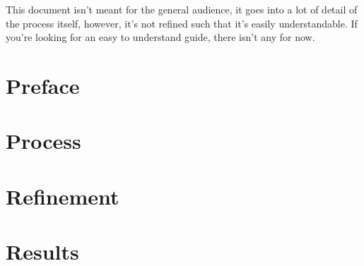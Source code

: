 \documentclass{article}
\begin{document}
	This document isn't meant for the general audience, it goes into a lot of detail of the process itself, however, it's not refined such that it's easily understandable. If you're looking for an easy to understand guide, there isn't any for now.
\newpage
\part{Preface}


\newpage


\newpage
\part{Process}
		


\newpage

\newpage

\newpage


\newpage
\part{Refinement}


\newpage
\part{Results}

\end{document}
